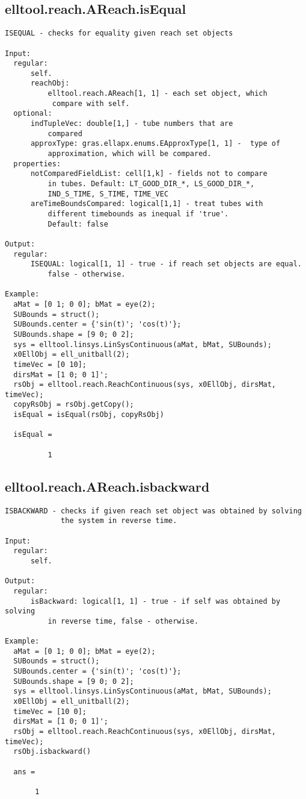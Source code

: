 \subsection{\texorpdfstring{elltool.reach.AReach.isEqual}{isEqual}}\label{method:elltool.reach.AReach.isEqual}
\begin{verbatim}
ISEQUAL - checks for equality given reach set objects

Input:
  regular:
      self.
      reachObj:
          elltool.reach.AReach[1, 1] - each set object, which
           compare with self.
  optional:
      indTupleVec: double[1,] - tube numbers that are
          compared
      approxType: gras.ellapx.enums.EApproxType[1, 1] -  type of
          approximation, which will be compared.
  properties:
      notComparedFieldList: cell[1,k] - fields not to compare
          in tubes. Default: LT_GOOD_DIR_*, LS_GOOD_DIR_*,
          IND_S_TIME, S_TIME, TIME_VEC
      areTimeBoundsCompared: logical[1,1] - treat tubes with
          different timebounds as inequal if 'true'.
          Default: false

Output:
  regular:
      ISEQUAL: logical[1, 1] - true - if reach set objects are equal.
          false - otherwise.

Example:
  aMat = [0 1; 0 0]; bMat = eye(2);
  SUBounds = struct();
  SUBounds.center = {'sin(t)'; 'cos(t)'};
  SUBounds.shape = [9 0; 0 2];
  sys = elltool.linsys.LinSysContinuous(aMat, bMat, SUBounds);
  x0EllObj = ell_unitball(2);
  timeVec = [0 10];
  dirsMat = [1 0; 0 1]';
  rsObj = elltool.reach.ReachContinuous(sys, x0EllObj, dirsMat, timeVec);
  copyRsObj = rsObj.getCopy();
  isEqual = isEqual(rsObj, copyRsObj)

  isEqual =

          1
\end{verbatim}
\subsection{\texorpdfstring{elltool.reach.AReach.isbackward}{isbackward}}\label{method:elltool.reach.AReach.isbackward}
\begin{verbatim}
ISBACKWARD - checks if given reach set object was obtained by solving
             the system in reverse time.

Input:
  regular:
      self.

Output:
  regular:
      isBackward: logical[1, 1] - true - if self was obtained by solving
          in reverse time, false - otherwise.

Example:
  aMat = [0 1; 0 0]; bMat = eye(2);
  SUBounds = struct();
  SUBounds.center = {'sin(t)'; 'cos(t)'};
  SUBounds.shape = [9 0; 0 2];
  sys = elltool.linsys.LinSysContinuous(aMat, bMat, SUBounds);
  x0EllObj = ell_unitball(2);
  timeVec = [10 0];
  dirsMat = [1 0; 0 1]';
  rsObj = elltool.reach.ReachContinuous(sys, x0EllObj, dirsMat, timeVec);
  rsObj.isbackward()

  ans =

       1
\end{verbatim}
